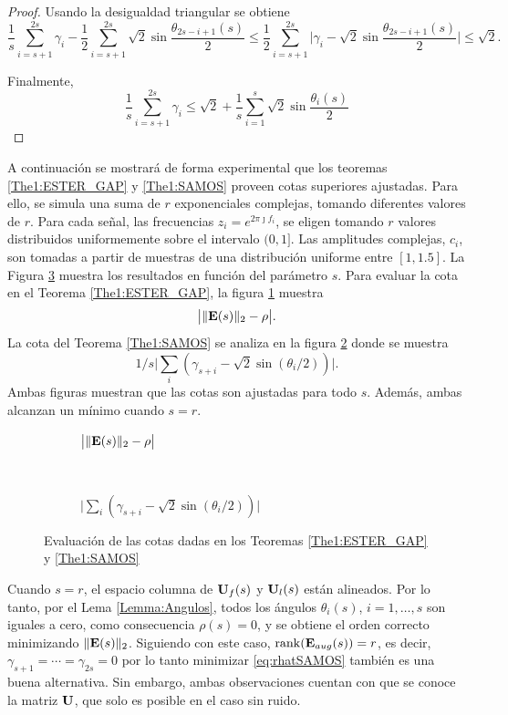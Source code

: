 \begin{proof}
	Usando la desigualdad triangular se obtiene
	\[\frac{1}{s}\sum_{i=s+1}^{2s}\gamma_i - \frac{1}{2}\sum_{i=s+1}^{2s}\sqrt{2}\sin\frac{\theta_{2s-i+1}(s)}{2} \le \frac{1}{2}\sum_{i=s+1}^{2s}\bigg|\gamma_i - \sqrt{2}\sin\frac{\theta_{2s-i+1}(s)}{2}\bigg|\le \sqrt{2}.\]
	
	Finalmente, 
	\[\frac{1}{s}\sum_{i=s+1}^{2s}\gamma_i\le\sqrt{2}+\frac{1}{s}\sum_{i=1}^s\sqrt{2}\sin\frac{\theta_i(s)}{2}\]
\end{proof}

A continuación se mostrará de forma experimental que los teoremas \ref{The1:ESTER_GAP} y \ref{The1:SAMOS} proveen cotas superiores ajustadas. Para ello, se simula una suma de $r$ exponenciales complejas, tomando diferentes valores de $r$. Para cada señal, las frecuencias $z_i=e^{2\pi\jmath f_i}$, se eligen tomando $r$ valores distribuidos uniformemente sobre el intervalo $(0,1]$. Las amplitudes complejas, $c_i$, son tomadas a partir de muestras de una distribución uniforme entre $[1, 1.5]$. La Figura \ref{Fig:BoundsAngles} muestra los resultados en función del parámetro $s$. Para evaluar la cota en el Teorema \eqref{The1:ESTER_GAP}, la figura \ref{Fig:ESTER_angles} muestra \[\big|\|\mathbf{E}(s)\|_2 - \rho\big|.\] 
La cota del Teorema \eqref{The1:SAMOS} se analiza en la figura \ref{Fig:SAMOS_angles} donde se muestra \[1/s\big|\sum_i(\gamma_{s+i}-\sqrt{2}\sin(\theta_i/2))\big|.\]
Ambas figuras muestran que las cotas son ajustadas para todo $s$. Además, ambas alcanzan un mínimo cuando $s=r$.

\begin{figure}[t]
	\centering
	\begin{subfigure}{0.45\textwidth}
		\centering
		\resizebox{\linewidth}{!}{}
		\caption{$\big|\|\mathbf{E}(s)\|_2 - \rho\big|$}
		\label{Fig:ESTER_angles}
	\end{subfigure}
	~
	\begin{subfigure}{0.45\textwidth}
		\centering
		\resizebox{\linewidth}{!}{}
		\caption{$\big|\sum_i(\gamma_{s+i}-\sqrt{2}\sin(\theta_i/2))\big|$}
		\label{Fig:SAMOS_angles} 
	\end{subfigure} 
	\caption{Evaluación de las cotas dadas en los Teoremas \eqref{The1:ESTER_GAP} y \eqref{The1:SAMOS}}
	\label{Fig:BoundsAngles}
\end{figure}

Cuando $s=r$, el espacio columna de $\mathbf{U}_f(s)$ y $\mathbf{U}_l(s)$ están alineados. Por lo tanto, por el  Lema \eqref{Lemma:Angulos}, todos los ángulos $\theta_i(s)$, $i = 1,\ldots,s$ son iguales a cero, como consecuencia $\rho(s)=0$, y se obtiene el orden correcto minimizando $\|\mathbf{E}(s)\|_2$. Siguiendo con este caso, $\mathrm{rank}(\mathbf{E}_{aug}(s)) = r$, es decir, $\gamma_{s+1} = \cdots = \gamma_{2s}=0$ por lo tanto minimizar \eqref{eq:rhatSAMOS} también es una buena alternativa. Sin embargo, ambas observaciones cuentan con que se conoce  la matriz $\mathbf{U}$, que solo es posible en el caso sin ruido.

